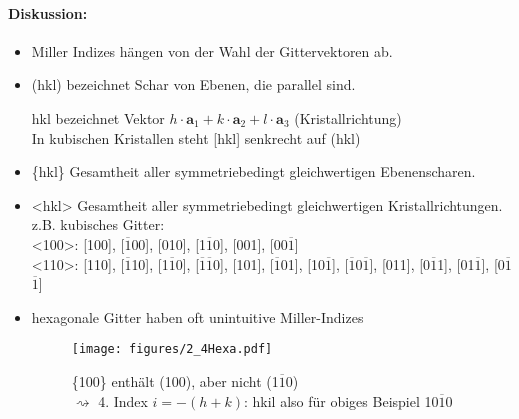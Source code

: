 \begin{itemize}
    \paragraph{Diskussion:}
    \begin{itemize}
        \item Miller Indizes hängen von der Wahl der Gittervektoren ab.
        \item (hkl) bezeichnet Schar von Ebenen, die parallel sind.
        \item [hkl] bezeichnet Vektor $h\cdot \textbf{a}_1 + k \cdot \textbf{a}_2 + l \cdot \textbf{a}_3$ (Kristallrichtung)\\
        In kubischen Kristallen steht [hkl] senkrecht auf (hkl)
        \item \{hkl\} Gesamtheit aller symmetriebedingt gleichwertigen Ebenenscharen.
        \item <hkl> Gesamtheit aller symmetriebedingt gleichwertigen Kristallrichtungen.\\
        z.B. kubisches Gitter:\\
        <100>: [100], [$\overline{1}$00], [010], [1$\overline{1}$0], [001], [00$\overline{1}$]\\
        <110>: [110], [$\overline{1}$10], [1$\overline{1}$0], [$\overline{1}$$\overline{1}$0], [101], [$\overline{1}$01], [10$\overline{1}$], [$\overline{1}$0$\overline{1}$], [011], [0$\overline{1}$1], [01$\overline{1}$], [0$\overline{1}$$\overline{1}$]
        \item hexagonale Gitter haben oft unintuitive Miller-Indizes\\
        \begin{figure}[H]
            \centering
            \texttt{[image: figures/2\_4Hexa.pdf]}
            \caption{\{100\} enthält (100), aber nicht (1$\overline{1}$0)\\
            $\rightsquigarrow$ 4. Index $i = -(h+k)$: hkil also für obiges Beispiel {10$\overline{1}$0}}
            \label{}
        \end{figure}
	\end{itemize}
\end{itemize}
